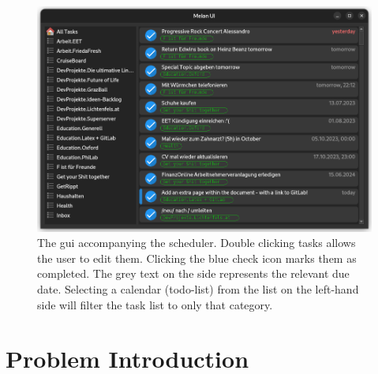 \documentclass{prettytex/ox/mmsc-special-topic}
\title{\topictitle}
\author{Candidate \candidatenumber}
\date{\today}
\begin{document}
  \pagestyle{plain}
  \mmscSpecialHeader

  \begin{abstract}
    \label{abstract}
    \vspace*{0.2cm}


    The algorithm is implemented four times, twice in Python, once in Rust and also in C++.
    Python module bindings to these low-level language implementations are provided using \texttt{rust-cpython} and \texttt{pybind11}, respectively.
  \end{abstract}

  \begin{figure}[H]
    \centering
    \includegraphics[width=0.85\linewidth]{figures/melon-ui.png}
    \caption{The \gls{gui} accompanying the scheduler. Double clicking tasks allows the user to edit them. Clicking the blue check icon marks them as completed. The grey text on the side represents the relevant due date. Selecting a calendar (todo-list) from the list on the left-hand side will filter the task list to only that category.}
    \label{fig:gui}
  \end{figure}

  \pagebreak
  \pagestyle{normal}


  \section{Problem Introduction}
  \label{sec:introduction}
\end{document}
